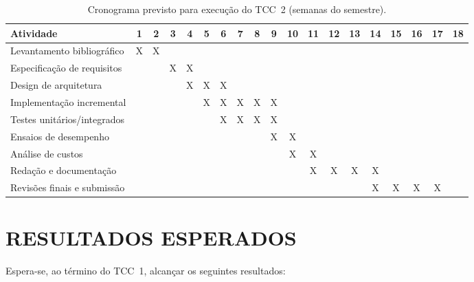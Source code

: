 \documentclass[openright]{normas-utf-tex}
\begin{document}
\begin{table}[H]
    \centering
    \caption{Cronograma previsto para execução do TCC~2 (semanas do semestre).}
    \label{tab:cronograma-tcc1}
    \renewcommand{\arraystretch}{1.2}
    \scriptsize
    \begin{tabularx}{\textwidth}{l*{18}{c}}
        \toprule
        Atividade & 1 & 2 & 3 & 4 & 5 & 6 & 7 & 8 & 9 & 10 & 11 & 12 & 13 & 14 & 15 & 16 & 17 & 18 \\
        \midrule
        Levantamento bibliográfico        & X & X &   &   &   &   &   &   &   &   &   &   &   &   &   &   &   &   \\
        Especificação de requisitos       &   &   & X & X &   &   &   &   &   &   &   &   &   &   &   &   &   &   \\
        Design de arquitetura             &   &   &   & X & X & X &   &   &   &   &   &   &   &   &   &   &   &   \\
        Implementação incremental         &   &   &   &   & X & X & X & X & X &   &   &   &   &   &   &   &   &   \\
        Testes unitários/integrados       &   &   &   &   &   & X & X & X & X &   &   &   &   &   &   &   &   &   \\
        Ensaios de desempenho             &   &   &   &   &   &   &   &   & X & X &   &   &   &   &   &   &   &   \\
        Análise de custos                 &   &   &   &   &   &   &   &   &   & X & X &   &   &   &   &   &   &   \\
        Redação e documentação            &   &   &   &   &   &   &   &   &   &   & X & X & X & X &   &   &   &   \\
        Revisões finais e submissão       &   &   &   &   &   &   &   &   &   &   &   &   &   & X & X & X & X &   \\
        \bottomrule
    \end{tabularx}
\end{table}

\chapter{RESULTADOS ESPERADOS}

Espera-se, ao término do TCC~1, alcançar os seguintes resultados:
\end{document}
